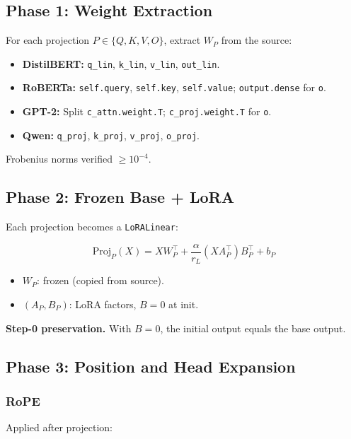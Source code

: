 \subsection{Phase 1: Weight Extraction}

For each projection $P \in \{Q, K, V, O\}$, extract $W_P$ from the source:

\begin{itemize}
\item \textbf{DistilBERT:} \texttt{q\_lin}, \texttt{k\_lin}, \texttt{v\_lin}, \texttt{out\_lin}.
\item \textbf{RoBERTa:} \texttt{self.query}, \texttt{self.key}, \texttt{self.value}; \texttt{output.dense} for \texttt{o}.
\item \textbf{GPT-2:} Split \texttt{c\_attn.weight.T}; \texttt{c\_proj.weight.T} for \texttt{o}.
\item \textbf{Qwen:} \texttt{q\_proj}, \texttt{k\_proj}, \texttt{v\_proj}, \texttt{o\_proj}.

\end{itemize}
Frobenius norms verified $\geq 10^{-4}$.

\subsection{Phase 2: Frozen Base + LoRA}

Each projection becomes a \texttt{LoRALinear}:

\[
\text{Proj}_P(X) = X W_P^\top + \frac{\alpha}{r_L} (X A_P^\top) B_P^\top + b_P
\tag{4.1}
\]

\begin{itemize}
\item $W_P$: frozen (copied from source).
\item $(A_P, B_P)$: LoRA factors, $B = 0$ at init.

\end{itemize}
\textbf{Step-0 preservation.} With $B = 0$, the initial output equals the base 
output.

\subsection{Phase 3: Position and Head Expansion}

\subsubsection{RoPE}

Applied after projection:

